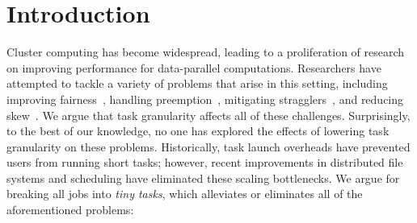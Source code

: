 \section{Introduction}
Cluster computing has become widespread, leading to a proliferation of
research on improving performance for data-parallel computations. 
Researchers have attempted
to tackle a variety of problems that arise in this setting,
including improving
fairness~\cite{zaharia2008improving,hindman2011mesos},
handling preemption~\cite{ananthanarayanan2012true,isard2009quincy},
mitigating stragglers~\cite{ananthanarayanan2010reining,ananthanarayanan2012why},
and reducing skew~\cite{ananthanarayanan2011scarlett,kwon2012skewtune,gufler2012load}.
We argue that task granularity affects all of these challenges. Surprisingly,
to the best of our knowledge, no one has explored the effects of lowering
task granularity on these problems.
Historically, task launch overheads have prevented users from running
short tasks; however, recent improvements in distributed file systems and
scheduling have eliminated these scaling bottlenecks.
We argue for
breaking all jobs into \emph{tiny tasks}, which alleviates or eliminates
all of the aforementioned problems:

